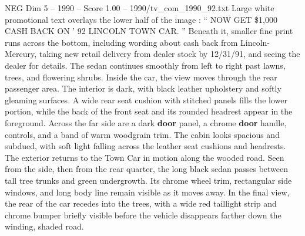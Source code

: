 \begin{textsample}{NEG Dim 5 – 1990 – Score 1.00 – 1990/tv\_com\_1990\_92.txt}
Large white promotional text overlays the lower half of the image : “ NOW GET \$1,000 CASH BACK ON ’ 92 LINCOLN TOWN CAR. ” Beneath it, smaller fine print runs across the bottom, including wording about cash back from Lincoln-Mercury, taking new retail delivery from dealer stock by 12/31/91, and seeing the dealer for details.
The sedan continues smoothly from left to right past lawns, trees, and flowering shrubs.
Inside the car, the view moves through the rear passenger area.
The interior is dark, with black leather upholstery and softly gleaming surfaces.
A wide rear seat cushion with stitched panels fills the lower portion, while the back of the front seat and its rounded headrest appear in the foreground.
Across the far side are a dark \textbf{door} panel, a chrome \textbf{door} handle, controls, and a band of warm woodgrain trim.
The cabin looks spacious and subdued, with soft light falling across the leather seat cushions and headrests.
The exterior returns to the Town Car in motion along the wooded road.
Seen from the side, then from the rear quarter, the long black sedan passes between tall tree trunks and green undergrowth.
Its chrome wheel trim, rectangular side windows, and long body line remain visible as it moves away.
In the final view, the rear of the car recedes into the trees, with a wide red taillight strip and chrome bumper briefly visible before the vehicle disappears farther down the winding, shaded road.

\end{textsample}
